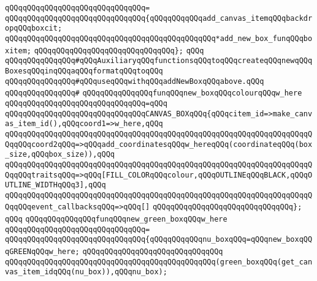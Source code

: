 \verb|qQQqqQQqqQQqqQQqqQQqqQQqqQQqqQQq=|\newline
\verb|qQQqqQQqqQQqqQQqqQQqqQQqqQQqqQQq{qQQqqQQqqQQqadd_canvas_itemqQQqbackdropqQQqboxcit;|\newline
\verb|qQQqqQQqqQQqqQQqqQQqqQQqqQQqqQQqqQQqqQQqqQQqqQQq*add_new_box_funqQQqboxitem;|\newline
\verb|qQQqqQQqqQQqqQQqqQQqqQQqqQQqqQQq};|\newline
\verb|qQQq|\newline
\newline
\verb|qQQqqQQqqQQqqQQq#qQQqAuxiliaryqQQqfunctionsqQQqtoqQQqcreateqQQqnewqQQqBoxesqQQqinqQQqaqQQqformatqQQqtoqQQq|\newline
\verb|qQQqqQQqqQQqqQQq#qQQquseqQQqwithqQQqaddNewBoxqQQqabove.qQQq|\newline
\verb|qQQqqQQqqQQqqQQq#|\newline
\verb|qQQqqQQqqQQqqQQqfunqQQqnew_boxqQQqcolourqQQqw_here|\newline
\verb|qQQqqQQqqQQqqQQqqQQqqQQqqQQqqQQq=qQQq|\newline
\verb|qQQqqQQqqQQqqQQqqQQqqQQqqQQqqQQqCANVAS_BOXqQQq{qQQqcitem_id=>make_canvas_item_id(),qQQqcoord1=>w_here,qQQq|\newline
\verb|qQQqqQQqqQQqqQQqqQQqqQQqqQQqqQQqqQQqqQQqqQQqqQQqqQQqqQQqqQQqqQQqqQQqqQQqqQQqcoord2qQQq=>qQQqadd_coordinatesqQQqw_hereqQQq(coordinateqQQq(box_size,qQQqbox_size)),qQQq|\newline
\verb|qQQqqQQqqQQqqQQqqQQqqQQqqQQqqQQqqQQqqQQqqQQqqQQqqQQqqQQqqQQqqQQqqQQqqQQqqQQqtraitsqQQq=>qQQq[FILL_COLORqQQqcolour,qQQqOUTLINEqQQqBLACK,qQQqOUTLINE_WIDTHqQQq3],qQQq|\newline
\verb|qQQqqQQqqQQqqQQqqQQqqQQqqQQqqQQqqQQqqQQqqQQqqQQqqQQqqQQqqQQqqQQqqQQqqQQqqQQqevent_callbacksqQQq=>qQQq[]|\newline
\verb|qQQqqQQqqQQqqQQqqQQqqQQqqQQqqQQq};|\newline
\verb|qQQq|\newline
\verb|qQQqqQQqqQQqqQQqfunqQQqnew_green_boxqQQqw_here|\newline
\verb|qQQqqQQqqQQqqQQqqQQqqQQqqQQqqQQq=|\newline
\verb|qQQqqQQqqQQqqQQqqQQqqQQqqQQqqQQq{qQQqqQQqqQQqnu_boxqQQq=qQQqnew_boxqQQqGREENqQQqw_here;|\newline
\verb|qQQqqQQqqQQqqQQqqQQqqQQqqQQqqQQq|\newline
\verb|qQQqqQQqqQQqqQQqqQQqqQQqqQQqqQQqqQQqqQQqqQQqqQQq(green_boxqQQq(get_canvas_item_idqQQq(nu_box)),qQQqnu_box);|\newline
